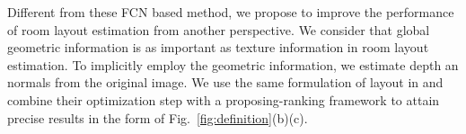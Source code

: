 Different from these FCN based method, we propose to improve the performance of room layout estimation from another perspective. We consider that global geometric information is as important as texture information in room layout estimation. To implicitly employ the geometric information, we estimate depth an normals from the original image. We use the same formulation of layout in \cite{dasgupta2016delay} and combine their optimization step with a proposing-ranking framework to attain precise results in the form of  Fig.~\ref{fig:definition}(b)(c).  
